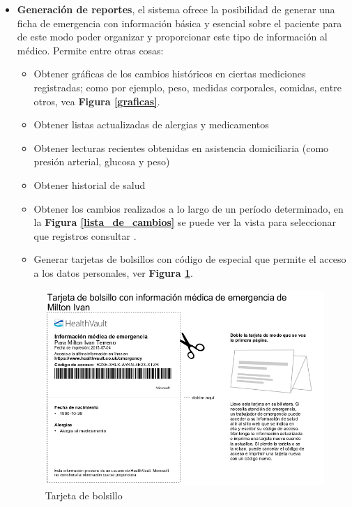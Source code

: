 \begin{itemize}
\item \textbf{Generación de reportes}, el sistema ofrece la posibilidad de generar una ficha de emergencia  con información básica y esencial sobre el paciente para de este modo poder organizar y proporcionar este tipo de información al médico. Permite entre otras cosas:
	\begin{itemize}
		\item Obtener gráficas de los cambios históricos en ciertas mediciones registradas; como por ejemplo, peso, medidas corporales, comidas, entre otros, vea \textbf{Figura \ref{graficas}}.
        \item Obtener listas actualizadas de alergias y medicamentos
		\item Obtener lecturas recientes obtenidas en asistencia domiciliaria (como presión arterial, glucosa y peso)
		\item Obtener historial de salud
        \item Obtener los cambios realizados a lo largo de un período determinado, en la \textbf{Figura \ref{lista_de_cambios}} se puede ver la vista para seleccionar que registros  consultar .
        \item Generar tarjetas de bolsillos con código de especial que permite el acceso a los datos personales, ver \textbf{Figura \ref{tarjeta_bolsillo}}.
	\end{itemize}
    
    \begin{figure}[h]
      \centering
      \includegraphics[width=.8\textwidth]{img/tp1/3-tarjeta_bolsillo}
      \caption{Tarjeta de bolsillo}
      \label{tarjeta_bolsillo}
    \end{figure} 
    

\end{itemize}
